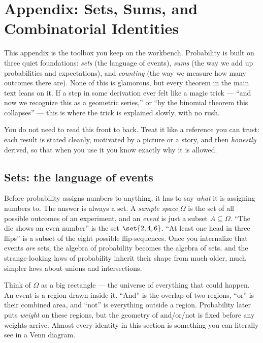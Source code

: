 \chapter{Appendix: Sets, Sums, and Combinatorial Identities}

This appendix is the toolbox you keep on the workbench. Probability is built
on three quiet foundations: \emph{sets} (the language of events), \emph{sums}
(the way we add up probabilities and expectations), and \emph{counting} (the
way we measure how many outcomes there are). None of this is glamorous, but
every theorem in the main text leans on it. If a step in some derivation ever
felt like a magic trick --- ``and now we recognize this as a geometric
series,'' or ``by the binomial theorem this collapses'' --- this is where the
trick is explained slowly, with no rush.

You do not need to read this front to back. Treat it like a reference you can
trust: each result is stated cleanly, motivated by a picture or a story, and
then \emph{honestly} derived, so that when you use it you know exactly why it
is allowed.

\section{Sets: the language of events}
\label{ch39:sets}

Before probability assigns numbers to anything, it has to say \emph{what} it
is assigning numbers to. The answer is always a set. A \emph{sample space}
$\Omega$ is the set of all possible outcomes of an experiment, and an
\emph{event} is just a subset $A \subseteq \Omega$. ``The die shows an even
number'' is the set $\set{2,4,6}$. ``At least one head in three flips'' is a
subset of the eight possible flip-sequences. Once you internalize that events
\emph{are} sets, the algebra of probability becomes the algebra of sets, and
the strange-looking laws of probability inherit their shape from much older,
much simpler laws about unions and intersections.

\begin{intuitionbox}
Think of $\Omega$ as a big rectangle --- the universe of everything that
could happen. An event is a region drawn inside it. ``And'' is the overlap of
two regions, ``or'' is their combined area, and ``not'' is everything outside
a region. Probability later puts \emph{weight} on these regions, but the
geometry of and/or/not is fixed before any weights arrive. Almost every
identity in this section is something you can literally see in a Venn diagram.
\end{intuitionbox}


